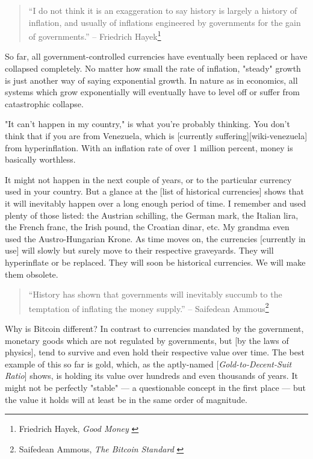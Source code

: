 \begin{quotation}
``I do not think it is an exaggeration to say history is largely a
history of inflation, and usually of inflations engineered by
governments for the gain of governments.''
\flushright -- Friedrich Hayek\footnote{Friedrich Hayek, \textit{Good Money} \cite{hayek-good-money}}
\end{quotation}

So far, all government-controlled currencies have eventually been
replaced or have collapsed completely. No matter how small the rate of
inflation, "steady" growth is just another way of saying exponential
growth. In nature as in economics, all systems which grow exponentially
will eventually have to level off or suffer from catastrophic collapse.

"It can't happen in my country," is what you're probably thinking. You
don't think that if you are from Venezuela, which is [currently
suffering][wiki-venezuela] from hyperinflation. With an inflation rate of over 1 million
percent, money is basically worthless.

It might not happen in the next couple of years, or to the particular
currency used in your country. But a glance at the [list of historical
currencies] shows that it will inevitably happen over a long enough period of
time. I remember and used plenty of those listed: the Austrian
schilling, the German mark, the Italian lira, the French franc, the
Irish pound, the Croatian dinar, etc. My grandma even used the
Austro-Hungarian Krone. As time moves on, the currencies [currently in
use] will slowly but surely move to their respective graveyards. They
will hyperinflate or be replaced. They will soon be historical
currencies. We will make them obsolete.

\begin{quotation}
``History has shown that governments will inevitably succumb to the
temptation of inflating the money supply.''
\flushright -- Saifedean Ammous\footnote{Saifedean Ammous, \textit{The Bitcoin
Standard} \cite{bitcoin-standard}}
\end{quotation}

Why is Bitcoin different? In contrast to currencies mandated by the
government, monetary goods which are not regulated by governments, but
[by the laws of physics], tend to survive and even hold their respective
value over time. The best example of this so far is gold, which, as the
aptly-named [\textit{Gold-to-Decent-Suit Ratio}] shows, is holding its value
over hundreds and even thousands of years. It might not be perfectly
"stable" --- a questionable concept in the first place --- but the value
it holds will at least be in the same order of magnitude.

